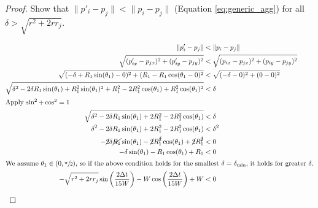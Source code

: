 \documentclass[conference]{IEEEtran}
\begin{document}
\begin{proof}
    Show that $\lVert p'_i - p_j\rVert < \lVert p_i - p_j\rVert$ (Equation \eqref{eq:generic_agg}) for all $\delta > \sqrt{r^2+2rr_j}$.

    \begin{align*}
      \lVert p'_i - p_j \rVert &< \lVert p_i - p_j \rVert \\
      \sqrt{(p'_{ix} - p_{jx})^2 + (p'_{iy} - p_{jy})^2} &< \sqrt{(p_{ix} - p_{jx})^2 + (p_{iy} - p_{jy})^2} \\
      \sqrt{(-\delta+R_1\sin(\theta_1)-0)^2 + (R_1-R_1\cos(\theta_1-0)^2} &< \sqrt{(-\delta-0)^2 + (0-0)^2} \\
      \sqrt{\delta^2-2\delta R_1\sin(\theta_1) + R_1^2\sin(\theta_1)^2 + R_1^2-2R_1^2\cos(\theta_1)+R_1^2\cos(\theta_1)^2} &< \delta \\
      \intertext{Apply $\sin^2+\cos^2=1$}
      \sqrt{\delta^2-2\delta R_1\sin(\theta_1) + 2R_1^2-2R_1^2\cos(\theta_1)} &< \delta \\
      \delta^2-2\delta R_1\sin(\theta_1) + 2R_1^2-2R_1^2\cos(\theta_1) &< \delta^2 \\
      -\cancel{2}\delta \cancel{R_1}\sin(\theta_1) - \cancel{2}R_1^{\cancel{2}}\cos(\theta_1) + \cancel{2}R_1^{\cancel{2}} &< 0 \\
      -\delta \sin(\theta_1) - R_1\cos(\theta_1) + R_1 &< 0 \\
      \intertext{We assume $\theta_1\in(0,\sfrac{\pi}{2})$, so if the above condition holds for the smallest $\delta=\delta_{\text{min}}$, it holds for greater $\delta$.}
      -\sqrt{r^2+2rr_j}\sin\bigg(\frac{2\Delta t}{15W}\bigg) - W\cos\bigg(\frac{2\Delta t}{15W}\bigg) + W &< 0
    \end{align*}
  \end{proof}
\end{document}
